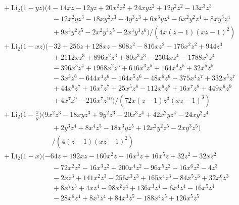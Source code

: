 \documentclass[letter,11pt,DIV=12,abstract=true,numbers=noenddot,titlepage=false,twocolumn=false,draft=false]{scrartcl}
\begin{document}
\begin{equation}
\begin{split}
& \quad + \text{Li}_2 \big(1 - yz \big) (4 - 14 x z - 12 y z + 20 x^2 z^2 + 24 x y z^2 + 12 y^2 z^2 - 13 x^3 z^3\\
      & \qquad \qquad \qquad \qquad - 12 x^2 y z^3 - 18 x y^2 z^3 - 4 y^3 z^3 + 6 x^3 y z^4 - 6 x^2 y^2 z^4 + 8 x y^3 z^4\\
      & \qquad \qquad \qquad \qquad + 9 x^3 y^2 z^5 - 2 x^2 y^3 z^5 - 2 x^3 y^3 z^6)/(4 x (z-1) (x z-1)^2)\\
& \quad + \text{Li}_2 \big(1 - xz \big) (-32 + 256 z + 128 x z - 808 z^2 - 816 x z^2 - 176 x^2 z^2 + 944 z^3\\
      & \qquad \qquad \qquad \qquad + 2112 x z^3 + 896 x^2 z^3 + 80 x^3 z^3 - 2504 x z^4 - 1788 x^2 z^4\\
      & \qquad \qquad \qquad \qquad - 396 x^3 z^4 + 1968 x^2 z^5 + 616 x^3 z^5 + 164 x^4 z^5 + 32 x^5 z^5\\
      & \qquad \qquad \qquad \qquad - 3 x^3 z^6 - 644 x^4 z^6 - 164 x^5 z^6 - 48 x^6 z^6 - 375 x^4 z^7 + 332 x^5 z^7\\
      & \qquad \qquad \qquad \qquad + 44 x^6 z^7 + 16 x^7 z^7 + 25 x^5 z^8 - 112 x^6 z^8 + 16 x^7 z^8 + 449 x^6 z^9\\
      & \qquad \qquad \qquad \qquad + 4 x^7 z^9 - 216 x^7 z^{10})/(72 x (z-1) z^3 (x z-1)^3)\\
& \quad + \text{Li}_2 \bigg(1 - \frac{x}{y} \bigg) (9 x^2 z^3 - 18 x y z^3 + 9 y^2 z^3 - 20 x^3 z^4 + 42 x^2 y z^4 - 24 x y^2 z^4\\
      & \qquad \qquad \qquad \qquad + 2 y^3 z^4 + 8 x^4 z^5 - 18 x^3 y z^5 + 12 x^2 y^2 z^5 - 2 x y^3 z^5)\\
      & \qquad \qquad \qquad \qquad /(4 (z-1) (x z-1)^2)\\
& \quad + \text{Li}_2 \big(1 - x \big) (-64 z + 192 x z - 160 x^2 z + 16 x^3 z + 16 x^5 z + 32 z^2 - 32 x z^2\\
      & \qquad \qquad \qquad \qquad - 72 x^2 z^2 - 16 x^3 z^2 + 200 x^4 z^2 - 96 x^5 z^2 - 16 x^6 z^2 - 4 z^3\\
      & \qquad \qquad \qquad \qquad - 2 x z^3 + 141 x^2 z^3 - 256 x^3 z^3 + 165 x^4 z^3 - 84 x^5 z^3 + 32 x^6 z^3\\
      & \qquad \qquad \qquad \qquad + 8 x^7 z^3 + 4 x z^4 - 98 x^2 z^4 + 136 x^3 z^4 - 6 x^4 z^4 - 16 x^5 z^4\\
      & \qquad \qquad \qquad \qquad - 28 x^6 z^4 + 8 x^7 z^4 + 84 x^3 z^5 - 188 x^4 z^5 + 126 x^5 z^5\\

\end{split}
\end{equation}
\end{document}
